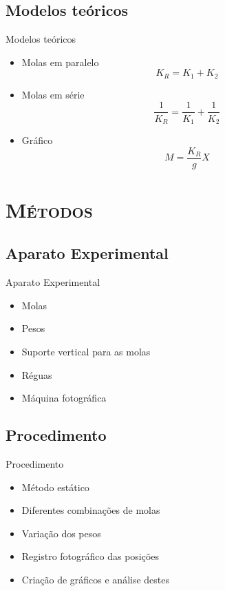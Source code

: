 \documentclass[xcolor=x11names,compress]{beamer}
\renewcommand{\(}{\begin{columns}}
\renewcommand{\)}{\end{columns}}
\newcommand{\<}[1]{\begin{column}{#1}}
\renewcommand{\>}{\end{column}}
\begin{document}
\subsection{Modelos teóricos}

\begin{frame}{Modelos teóricos}
	\begin{itemize}
		\item Molas em paralelo
			\[ K_{R} = K_{1}+K_{2}\]
		\item Molas em série
			\[ \frac{1}{K_{R}} = \frac{1}{K_{1}} + \frac{1}{K_{2}} \]
		\item Gráfico
			\[M = \frac{K_{R}}{g}X\]
	\end{itemize}
\end{frame}


\section{\scshape Métodos}


\subsection{Aparato Experimental}

\begin{frame}{Aparato Experimental}
	\begin{itemize}
		\item Molas
		\item Pesos
		\item Suporte vertical para as molas
		\item Réguas
		\item Máquina fotográfica
	\end{itemize}
\end{frame}



\subsection{Procedimento}

\begin{frame}{Procedimento}
	\begin{itemize}
		\item Método estático
		\item Diferentes combinações de molas
		\item Variação dos pesos
		\item Registro fotográfico das posições
		\item Criação de gráficos e análise destes
	\end{itemize}
\end{frame}
\end{document}
